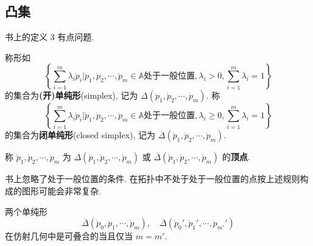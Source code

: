 \documentclass[color=black,device=normal,lang=cn,mode=geye]{elegantnote}
\begin{document}
\subsection{凸集}
书上的定义 3 有点问题.
\begin{definition}[书上的定义 3]
    称形如
    \[\left\{\sum\limits_{i=1}^m\lambda_i\dot{p}_i\Bigg|\dot{p}_1,\dot{p}_2,\cdots,\dot{p}_m\in\mathbb{A}\text{处于一般位置},\lambda_i>0,\sum\limits_{i=1}^m\lambda_i=1\right\}\]
    的集合为\textbf{(开)单纯形}(simplex), 记为 $\Delta(\dot{p}_1,\dot{p}_2,\cdots,\dot{p}_m)$. 称
    \[\left\{\sum\limits_{i=1}^m\lambda_i\dot{p}_i\Bigg|\dot{p}_1,\dot{p}_2,\cdots,\dot{p}_m\in\mathbb{A}\text{处于一般位置},\lambda_i\geq0,\sum\limits_{i=1}^m\lambda_i=1\right\}\]
    的集合为\textbf{闭单纯形}(closed simplex), 记为 $\overline{\Delta}(\dot{p}_1,\dot{p}_2,\cdots,\dot{p}_m)$.
    
    称 $\dot{p}_1,\dot{p}_2,\cdots,\dot{p}_m$ 为 $\Delta(\dot{p}_1,\dot{p}_2,\cdots,\dot{p}_m)$ 或 $\overline{\Delta}(\dot{p}_1,\dot{p}_2,\cdots,\dot{p}_m)$ 的\textbf{顶点}.
\end{definition}
书上忽略了处于一般位置的条件. 在拓扑中不处于处于一般位置的点按上述规则构成的图形可能会非常复杂.
\begin{theorem}
    两个单纯形
    \[\overline{\Delta}(\dot{p}_0,\dot{p}_1,\cdots,\dot{p}_m),\quad\overline{\Delta}(\dot{p}_0',\dot{p}_1',\cdots,\dot{p}_{m'}')\]
    在仿射几何中是可叠合的当且仅当 $m=m'$.
\end{theorem}
\end{document}
